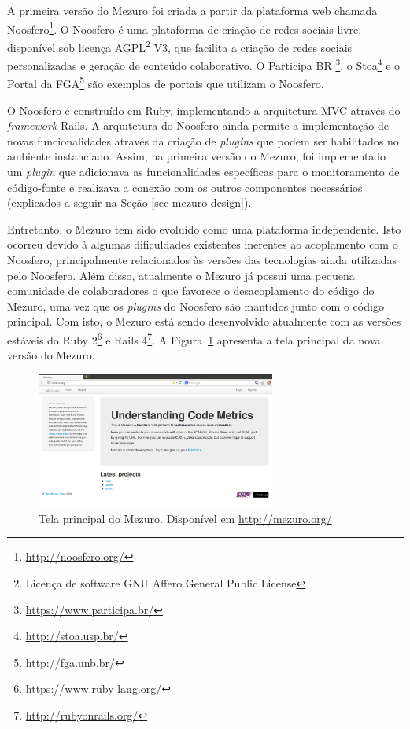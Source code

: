%

A primeira versão do Mezuro foi criada a partir da plataforma web chamada Noosfero\footnote{\url{http://noosfero.org/}}. O Noosfero é uma plataforma de criação de redes sociais livre, disponível sob licença AGPL\footnote{Licença de software GNU Affero General Public License} V3, que facilita a criação de redes sociais personalizadas e geração de conteúdo colaborativo. O Participa BR \footnote{\url{https://www.participa.br/}}, o Stoa\footnote{\url{http://stoa.usp.br/}} e o Portal da FGA\footnote{\url{http://fga.unb.br/}} são exemplos de portais que utilizam o Noosfero. 

%

O Noosfero é construído em Ruby, implementando a arquitetura MVC através do \emph{framework} Rails. A arquitetura do Noosfero ainda permite a implementação de novas funcionalidades através da criação de \emph{plugins} que podem ser habilitados no ambiente instanciado. Assim, na primeira versão do Mezuro, foi implementado um \emph{plugin} que adicionava as funcionalidades específicas para o monitoramento de código-fonte e realizava a conexão com os outros componentes necessários (explicados a seguir na Seção \ref{sec-mezuro-design}).

%

Entretanto, o Mezuro tem sido evoluído como uma plataforma independente. Isto ocorreu devido à algumas dificuldades existentes inerentes ao acoplamento com o Noosfero, principalmente relacionados às versões das tecnologias ainda utilizadas pelo Noosfero. Além disso, atualmente o Mezuro já possui uma pequena comunidade de colaboradores o que favorece o desacoplamento do código do Mezuro, uma vez que os \emph{plugins} do Noosfero são mantidos junto com o código principal. Com isto, o Mezuro está sendo desenvolvido atualmente com as versões estáveis do Ruby 2\footnote{\url{https://www.ruby-lang.org/}} e Rails 4\footnote{\url{http://rubyonrails.org/}}. A Figura~\ref{mezuro} apresenta a tela principal da nova versão do Mezuro.

%

\graphicspath{{figuras/}}
\begin{figure}[h]
\centering
\includegraphics[width=0.7\textwidth]{mezuro-standalone}
\caption{Tela principal do Mezuro. Disponível em \url{http://mezuro.org/}}
\label{mezuro}
\end{figure}

